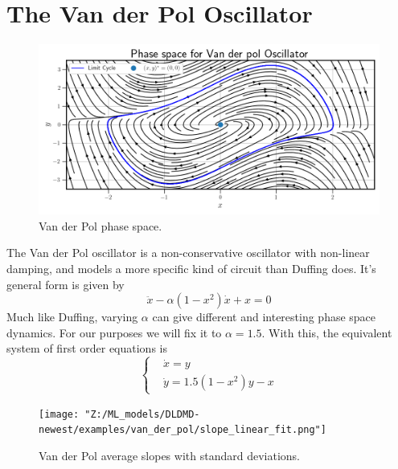\section{The Van der Pol Oscillator}
\label{section:van der pol results}

\begin{figure}[ht]
    \centering
    \begin{minipage}{\textwidth}
        \includegraphics[width=\textwidth]{"Figures/van_der_pol_phase_space.png"} 
    \end{minipage}
    \caption{Van der Pol phase space.}
    \label{fig:van der pol phase space}
\end{figure}

The Van der Pol oscillator is a non-conservative oscillator with non-linear damping, and models a more 
specific kind of circuit than Duffing does. It's general form is given by 
\begin{equation}
    \ddot{x} - \alpha(1 - x^2)\dot{x} + x = 0
\end{equation}
Much like Duffing, varying $\alpha$ can give different and interesting phase space dynamics. For our
purposes we will fix it to $\alpha = 1.5$. With this, the equivalent system of first order equations
is 
\begin{equation}
    \begin{cases}
        & \dot{x} = y \\
        & \dot{y} = 1.5(1 - x^2)y - x  
    \end{cases}
\end{equation}

\begin{figure}[ht]
    \centering
    \begin{minipage}{\textwidth}
        \texttt{[image: "Z:/ML\_models/DLDMD-newest/examples/van\_der\_pol/slope\_linear\_fit.png"]} 
    \end{minipage}
    \caption{Van der Pol average slopes with standard deviations.}
    \label{fig:van der pol average slopes}
\end{figure}

